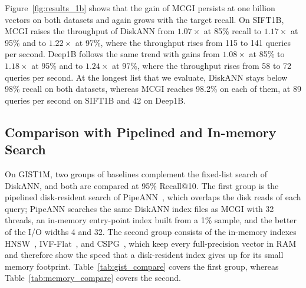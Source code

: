 \documentclass{article}
\theoremstyle{plain}
\theoremstyle{definition}
\theoremstyle{remark}
\newcommand{\ours}{MCGI\xspace}
\begin{document}
Figure~\ref{fig:results_1b} shows that the gain of \ours{} persists at one billion vectors on both datasets and again grows with the target recall. On SIFT1B, \ours{} raises the throughput of DiskANN from $1.07\times$ at 85\% recall to $1.17\times$ at 95\% and to $1.22\times$ at 97\%, where the throughput rises from 115 to 141 queries per second. Deep1B follows the same trend with gains from $1.08\times$ at 85\% to $1.18\times$ at 95\% and to $1.24\times$ at 97\%, where the throughput rises from 58 to 72 queries per second. At the longest list that we evaluate, DiskANN stays below 98\% recall on both datasets, whereas \ours{} reaches 98.2\% on each of them, at 89 queries per second on SIFT1B and 42 on Deep1B.

\subsection{Comparison with Pipelined and In-memory Search}

On GIST1M, two groups of baselines complement the fixed-list search of DiskANN, and both are compared at 95\% Recall@10. The first group is the pipelined disk-resident search of PipeANN~\cite{osdi25pipeann, fast26odinann}, which overlaps the disk reads of each query; PipeANN searches the same DiskANN index files as \ours{} with 32 threads, an in-memory entry-point index built from a 1\% sample, and the better of the I/O widths 4 and 32. The second group consists of the in-memory indexes HNSW~\cite{malkov2018efficient}, IVF-Flat~\cite{johnson2019billion}, and CSPG~\cite{NEURIPS2024_bab1486c}, which keep every full-precision vector in RAM and therefore show the speed that a disk-resident index gives up for its small memory footprint. Table~\ref{tab:gist_compare} covers the first group, whereas Table~\ref{tab:memory_compare} covers the second.
\end{document}
